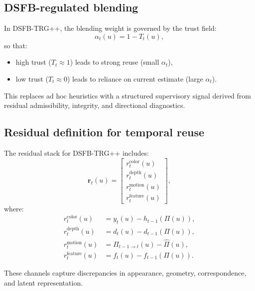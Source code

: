 \documentclass[11pt,letterpaper]{article}
\theoremstyle{gcresult}
\theoremstyle{definition}
\begin{document}
\subsection{DSFB-regulated blending}

In DSFB-TRG++, the blending weight is governed by the trust field:
\begin{equation}
\alpha_t(u)=1 - T_t(u),
\end{equation}
so that:
\begin{itemize}[leftmargin=1.5em]
    \item high trust ($T_t\approx 1$) leads to strong reuse (small $\alpha_t$),
    \item low trust ($T_t\approx 0$) leads to reliance on current estimate (large $\alpha_t$).
\end{itemize}

This replaces ad hoc heuristics with a structured supervisory signal derived from residual admissibility, integrity, and directional diagnostics.


\subsection{Residual definition for temporal reuse}

The residual stack for DSFB-TRG++ includes:
\begin{equation}
\mathbf r_t(u)=
\begin{bmatrix}
r^{\mathrm{color}}_t(u)\\
r^{\mathrm{depth}}_t(u)\\
r^{\mathrm{motion}}_t(u)\\
r^{\mathrm{feature}}_t(u)
\end{bmatrix},
\end{equation}
where:
\begin{align}
r^{\mathrm{color}}_t(u) &= y_t(u) - h_{t-1}(\Pi(u)),\\
r^{\mathrm{depth}}_t(u) &= d_t(u) - d_{t-1}(\Pi(u)),\\
r^{\mathrm{motion}}_t(u) &= \Pi_{t-1\rightarrow t}(u) - \hat{\Pi}(u),\\
r^{\mathrm{feature}}_t(u) &= f_t(u) - f_{t-1}(\Pi(u)).
\end{align}

These channels capture discrepancies in appearance, geometry, correspondence, and latent representation.
\end{document}
